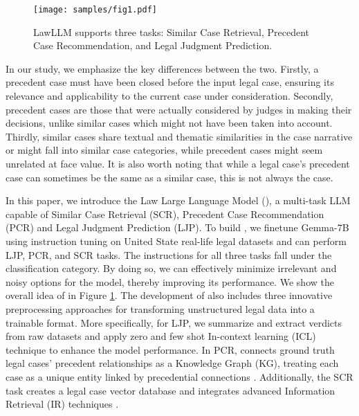 \begin{figure}[t]
  \centering
  \texttt{[image: samples/fig1.pdf]}
  \caption{LawLLM supports three tasks: Similar Case Retrieval, Precedent Case Recommendation, and Legal Judgment Prediction.}
  \label{fig:intro}
\end{figure}

In our study, we emphasize the key differences between the two. Firstly, a precedent case must have been closed before the input legal case, ensuring its relevance and applicability to the current case under consideration. Secondly, precedent cases are those that were actually considered by judges in making their decisions, unlike similar cases which might not have been taken into account. Thirdly, similar cases share textual and thematic similarities in the case narrative or might fall into similar case categories, while precedent cases might seem unrelated at face value. It is also worth noting that while a legal case's precedent case can sometimes be the same as a similar case, this is not always the case. 

In this paper, we introduce the Law Large Language Model (\sysname), a multi-task LLM capable of Similar Case Retrieval (SCR), Precedent Case Recommendation (PCR) and Legal Judgment Prediction (LJP).
To build \sysname, we finetune Gemma-7B \cite{team2023gemini} using instruction tuning on United State real-life legal datasets and can perform LJP, PCR, and SCR tasks. The instructions for all three tasks fall under the classification category. By doing so, we can effectively minimize irrelevant and noisy options for the model, thereby improving its performance. We show the overall idea of \sysname in Figure \ref{fig:intro}. The development of \sysname also includes three innovative preprocessing approaches for transforming unstructured legal data into a trainable format. More specifically, for LJP, we summarize and extract verdicts from raw datasets and apply zero and few shot In-context learning (ICL) \cite{xie2021explanation, jin2024impact} technique to enhance the model performance. In PCR, \sysname connects ground truth legal cases' precedent relationships as a Knowledge Graph (KG), treating each case as a unique entity linked by precedential connections \cite{shu2024knowledge}. Additionally, the SCR task creates a legal case vector database and integrates advanced Information Retrieval (IR) techniques \cite{ethayarajh2019contextual, jin2024health}.


